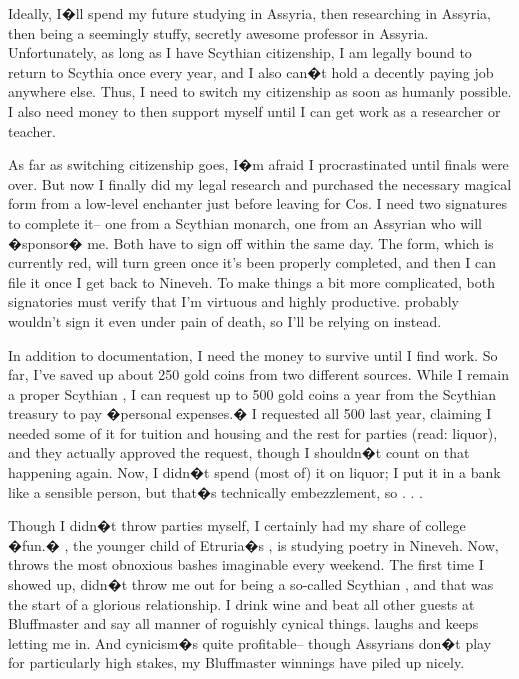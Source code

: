 \documentclass[char]{Kos}
\begin{document}
Ideally, I�ll spend my future studying in Assyria, then researching in Assyria, then being a seemingly stuffy, secretly awesome professor in Assyria. Unfortunately, as long as I have Scythian citizenship, I am legally bound to return to Scythia once every year, and I also can�t hold a decently paying job anywhere else. Thus, I need to switch my citizenship as soon as humanly possible. I also need money to then support myself until I can get work as a researcher or teacher.

As far as switching citizenship goes, I�m afraid I procrastinated until finals were over. But now I finally did my legal research and purchased the necessary magical form from a low-level enchanter just before leaving for Cos. I need two signatures to complete it-- one from a Scythian monarch, one from an Assyrian who will �sponsor� me. Both have to sign off within the same day. The form, which is currently red, will turn green once it's been properly completed, and then I can file it once I get back to Nineveh. To make things a bit more complicated, both signatories must verify that I'm virtuous and highly productive. \cQueenTwo{\Monarch} \cQueenTwo{\nickname} probably wouldn't sign it even under pain of death, so I'll be relying on \cKingTwo{\nickname} instead.

In addition to documentation, I need the money to survive until I find work. So far, I've saved up about 250 gold coins from two different sources. While I remain a proper Scythian \cWard{\prince}, I can request up to 500 gold coins a year from the Scythian treasury to pay �personal expenses.� I requested all 500 last year, claiming I needed some of it for tuition and housing and the rest for parties (read: liquor), and they actually approved the request, though I shouldn�t count on that happening again. Now, I didn�t spend (most of) it on liquor; I put it in a bank like a sensible person, but that�s technically embezzlement, so . . . 

Though I didn�t throw parties myself, I certainly had my share of college �fun.� \cPoet{\Prince} \cPoet{\name}, the younger child of Etruria�s \cKingOne{\Monarch} \cKingOne{\name}, is studying poetry in Nineveh. Now, \cPoet{\they} throws the most obnoxious bashes imaginable every weekend. The first time I showed up, \cPoet{\they} didn�t throw me out for being a so-called Scythian \cWard{\prince}, and that was the start of a glorious relationship. I drink \cPoet{\their} wine and beat all \cPoet{\their} other guests at Bluffmaster and say all manner of roguishly cynical things. \cPoet{\They} laughs and keeps letting me in. And cynicism�s quite profitable-- though Assyrians don�t play for particularly high stakes, my Bluffmaster winnings have piled up nicely.
\end{document}
